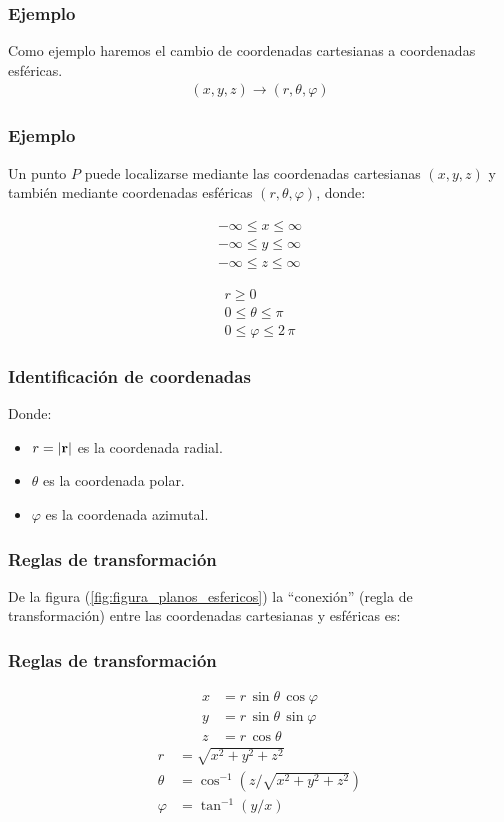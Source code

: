 \documentclass[12pt]{beamer}
\begin{document}
\begin{frame}
\frametitle{Ejemplo}
Como ejemplo haremos el cambio de coordenadas cartesianas a coordenadas esféricas.
\begin{align*}
(x, y, z) \longrightarrow (r, \theta, \varphi)
\end{align*}
\end{frame}
\begin{frame}
\frametitle{Ejemplo}
Un punto $P$ puede localizarse mediante las coordenadas cartesianas $(x, y, z)$ y también mediante coordenadas esféricas $(r, \theta, \varphi)$, donde:
\pause
\begin{minipage}{0.4\linewidth}
\begin{align*}
-\infty \le x \le \infty \\
-\infty \le y \le \infty \\
-\infty \le z \le \infty
\end{align*}
\end{minipage}
\hspace{0.3cm}
\begin{minipage}{0.4\linewidth}
\begin{align*}
r \geq 0 \\
0 \le \theta \le \pi \\
0 \le \varphi \le 2 \, \pi
\end{align*}
\end{minipage}
\end{frame}
\begin{frame}
\frametitle{Identificación de coordenadas}
Donde:
\pause
\begin{itemize}
\item $r = \abs{\vb{r}}$ es la coordenada radial.
\item $\theta$ es la coordenada polar.
\item $\varphi$ es la coordenada azimutal.
\end{itemize}
\end{frame}
\begin{frame}
\frametitle{Reglas de transformación}
De la figura (\ref{fig:figura_planos_esfericos}) la \enquote{conexión} (regla de transformación)  entre las coordenadas cartesianas y esféricas es:
\end{frame}
\begin{frame}
\frametitle{Reglas de transformación}
\begin{align*}
x &= r \, \sin \theta \, \cos \varphi \\
y &= r \, \sin \theta \, \sin \varphi \\
z &= r \, \cos \theta
\end{align*}
\begin{align*}
r &= \sqrt{x^{2} + y^{2} + z^{2}} \\
\theta &= \cos^{-1} \left( z / \sqrt{x^{2} + y^{2} + z^{2}} \right) \\
\varphi &= \tan^{-1} (y/x)
\end{align*}
\end{frame}
\end{document}
